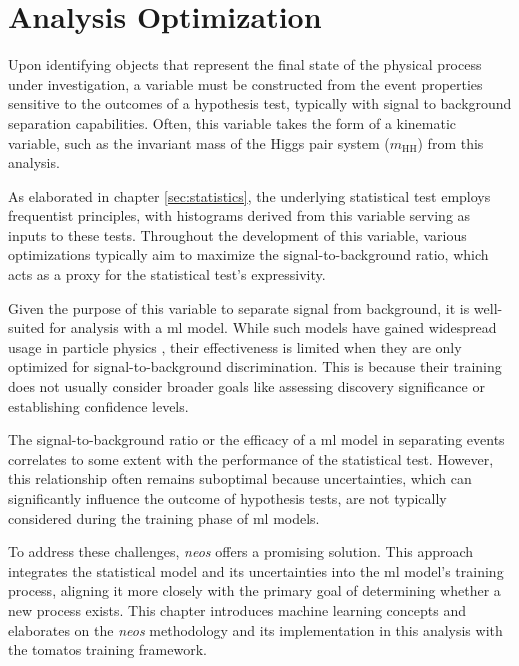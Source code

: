 \chapter{Analysis Optimization}\label{sec:analysis_optimization}

Upon identifying objects that represent the final state of the physical process under investigation, a variable must be constructed from the event properties sensitive to the outcomes of a hypothesis test, typically with signal to background separation capabilities. Often, this variable takes the form of a kinematic variable, such as the invariant mass of the Higgs pair system ($m_\text{HH}$) from this analysis.

As elaborated in chapter \ref{sec:statistics}, the underlying statistical test employs frequentist principles, with histograms derived from this variable serving as inputs to these tests. Throughout the development of this variable, various optimizations typically aim to maximize the signal-to-background ratio, which acts as a proxy for the statistical test's expressivity.

Given the purpose of this variable to separate signal from background, it is well-suited for analysis with a \ac{ml} model. While such models have gained widespread usage in particle physics \citep{albertsson2019machine,shlomi2020graph,feickert2021living,Schwartz2021Modern}, their effectiveness is limited when they are only optimized for signal-to-background discrimination. This is because their training does not usually consider broader goals like assessing discovery significance or establishing confidence levels.

The signal-to-background ratio or the efficacy of a \ac{ml} model in separating events correlates to some extent with the performance of the statistical test. However, this relationship often remains suboptimal because uncertainties, which can significantly influence the outcome of hypothesis tests, are not typically considered during the training phase of \ac{ml} models.

To address these challenges, \textit{\acf{neos}} \citep{Simpson_2023} offers a promising solution. This approach integrates the statistical model and its uncertainties into the \ac{ml} model's training process, aligning it more closely with the primary goal of determining whether a new process exists. This chapter introduces machine learning concepts and elaborates on the \textit{\ac{neos}} methodology and its implementation in this analysis with the \ac{tomatos} training framework.


